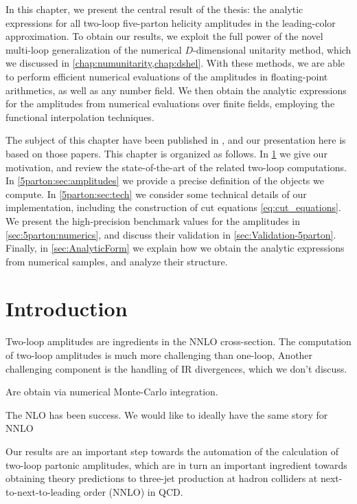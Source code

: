 In this chapter, we present the central result of the thesis:
the analytic expressions for all two-loop five-parton helicity amplitudes in the leading-color approximation.
To obtain our results, we exploit the full power of the novel multi-loop generalization of the numerical $D$-dimensional unitarity method,
which we discussed in \cref{chap:numunitarity,chap:dshel}.
With these methods, we are able to perform efficient numerical evaluations of the amplitudes in floating-point arithmetics, as well as any number field.
We then obtain the analytic expressions for the amplitudes from numerical evaluations over finite fields,
employing the functional interpolation techniques.

The subject of this chapter have been published in \cite{Abreu:2018jgq,Abreu:2019odu},
and our presentation here is based on those papers.
This chapter is organized as follows.
In \cref{5parton:sec:intro} we give our motivation, and review the state-of-the-art of the related two-loop computations.
In \cref{5parton:sec:amplitudes} we provide a precise definition  of the objects we compute.
In \cref{5parton:sec:tech} we consider some technical details of our implementation, including
the construction of cut equations \eqref{eq:cut_equations}.
We present the high-precision benchmark values for the amplitudes in \cref{sec:5parton:numerics},
and discuss their validation in \cref{sec:Validation-5parton}.
Finally, in \cref{sec:AnalyticForm} we explain how we obtain the analytic expressions from numerical samples,
and analyze their structure.

\section{Introduction}
\label{5parton:sec:intro}

Two-loop amplitudes are ingredients in the NNLO cross-section.
The computation of two-loop amplitudes is much more challenging than one-loop,
Another challenging component is the handling of IR divergences, which we don't discuss.

Are obtain via numerical Monte-Carlo integration. 

The NLO has been success.
We would like to ideally have the same story for NNLO

Our results are an important step towards the automation of
the calculation of two-loop partonic amplitudes, which
are in turn an important ingredient towards obtaining
theory predictions to three-jet production at hadron colliders
at next-to-next-to-leading order (NNLO) in QCD.

